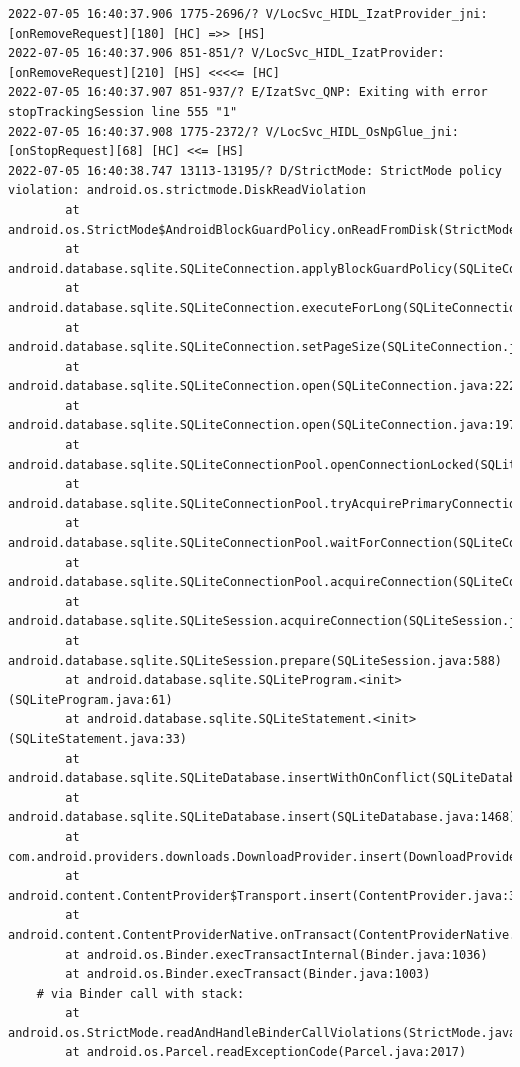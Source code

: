\documentclass[a4paper,12pt]{book}
\begin{document}
\begin{lstlisting}
2022-07-05 16:40:37.906 1775-2696/? V/LocSvc_HIDL_IzatProvider_jni: [onRemoveRequest][180] [HC] =>> [HS]
2022-07-05 16:40:37.906 851-851/? V/LocSvc_HIDL_IzatProvider: [onRemoveRequest][210] [HS] <<<<= [HC]
2022-07-05 16:40:37.907 851-937/? E/IzatSvc_QNP: Exiting with error stopTrackingSession line 555 "1"
2022-07-05 16:40:37.908 1775-2372/? V/LocSvc_HIDL_OsNpGlue_jni: [onStopRequest][68] [HC] <<= [HS]
2022-07-05 16:40:38.747 13113-13195/? D/StrictMode: StrictMode policy violation: android.os.strictmode.DiskReadViolation
        at android.os.StrictMode$AndroidBlockGuardPolicy.onReadFromDisk(StrictMode.java:1571)
        at android.database.sqlite.SQLiteConnection.applyBlockGuardPolicy(SQLiteConnection.java:1138)
        at android.database.sqlite.SQLiteConnection.executeForLong(SQLiteConnection.java:688)
        at android.database.sqlite.SQLiteConnection.setPageSize(SQLiteConnection.java:260)
        at android.database.sqlite.SQLiteConnection.open(SQLiteConnection.java:222)
        at android.database.sqlite.SQLiteConnection.open(SQLiteConnection.java:197)
        at android.database.sqlite.SQLiteConnectionPool.openConnectionLocked(SQLiteConnectionPool.java:505)
        at android.database.sqlite.SQLiteConnectionPool.tryAcquirePrimaryConnectionLocked(SQLiteConnectionPool.java:949)
        at android.database.sqlite.SQLiteConnectionPool.waitForConnection(SQLiteConnectionPool.java:699)
        at android.database.sqlite.SQLiteConnectionPool.acquireConnection(SQLiteConnectionPool.java:380)
        at android.database.sqlite.SQLiteSession.acquireConnection(SQLiteSession.java:896)
        at android.database.sqlite.SQLiteSession.prepare(SQLiteSession.java:588)
        at android.database.sqlite.SQLiteProgram.<init>(SQLiteProgram.java:61)
        at android.database.sqlite.SQLiteStatement.<init>(SQLiteStatement.java:33)
        at android.database.sqlite.SQLiteDatabase.insertWithOnConflict(SQLiteDatabase.java:1597)
        at android.database.sqlite.SQLiteDatabase.insert(SQLiteDatabase.java:1468)
        at com.android.providers.downloads.DownloadProvider.insert(DownloadProvider.java:972)
        at android.content.ContentProvider$Transport.insert(ContentProvider.java:309)
        at android.content.ContentProviderNative.onTransact(ContentProviderNative.java:154)
        at android.os.Binder.execTransactInternal(Binder.java:1036)
        at android.os.Binder.execTransact(Binder.java:1003)
    # via Binder call with stack:
        at android.os.StrictMode.readAndHandleBinderCallViolations(StrictMode.java:2289)
        at android.os.Parcel.readExceptionCode(Parcel.java:2017)

\end{lstlisting}
\end{document}
